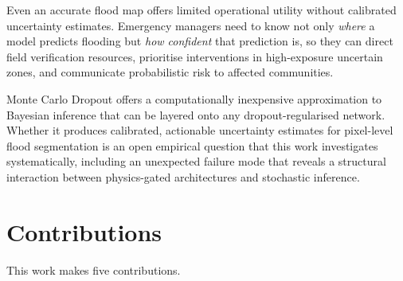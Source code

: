 \documentclass[12pt,oneside]{report}
\begin{document}
Even an accurate flood map offers limited operational utility without calibrated
uncertainty estimates.
Emergency managers need to know not only \emph{where} a model predicts flooding
but \emph{how confident} that prediction is, so they can direct field
verification resources, prioritise interventions in high-exposure uncertain
zones, and communicate probabilistic risk to affected communities.

Monte Carlo Dropout \cite{gal2016dropout} offers a computationally inexpensive
approximation to Bayesian inference that can be layered onto any
dropout-regularised network.
Whether it produces calibrated, actionable uncertainty estimates for pixel-level
flood segmentation is an open empirical question that this work investigates
systematically, including an unexpected failure mode that reveals a structural
interaction between physics-gated architectures and stochastic inference.

\section{Contributions}

This work makes five contributions.
\end{document}
